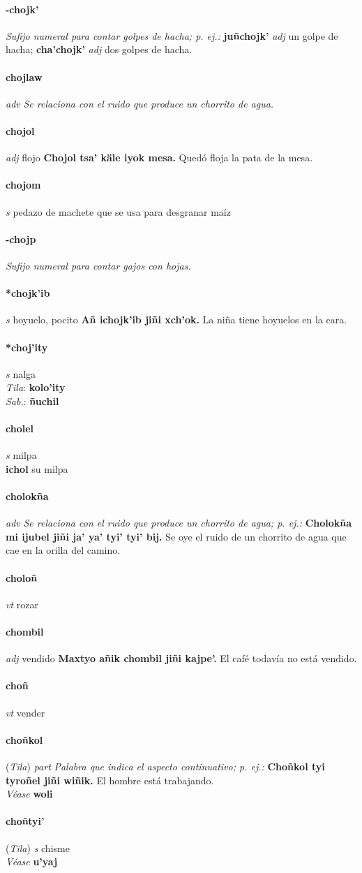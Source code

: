 \documentclass{scrbook}
\newcommand{\entry}[1]{\paragraph{#1}}
\newcommand{\nontranslationdef}[1]{\textit{#1}}
\newcommand{\partofspeech}[1]{\textit{#1}}
\newcommand{\spanishtranslation}[1]{#1}
\newcommand{\cholexample}[1]{\textbf{#1}}
\newcommand{\exampletranslation}[1]{#1}
\newcommand{\dialectvariant}[1]{\\\textit{#1}:}
\newcommand{\dialectword}[1]{\textbf{#1}}
\newcommand{\alsosee}[1]{\\\textit{Véase} \textbf{#1}}
\newcommand{\relevantdialect}[1]{(\textit{#1})}
\newcommand{\secondaryentry}[1]{\\\textbf{#1}}
\newcommand{\secondpartofspeech}[1]{\textit{#1}}
\newcommand{\secondtranslation}[1]{#1}
\begin{document}
\begin{multicols}{2}
\entry{-chojk'}
\nontranslationdef{Sufijo numeral para contar golpes de hacha; p. ej.:}
\cholexample{juñchojk'}
\secondpartofspeech{adj}
\exampletranslation{un golpe de hacha;}
\cholexample{cha'chojk'}
\secondpartofspeech{adj}
\exampletranslation{dos golpes de hacha.}

\entry{chojlaw}
\partofspeech{adv}
\nontranslationdef{Se relaciona con el ruido que produce un chorrito de agua.}

\entry{chojol}
\partofspeech{adj}
\spanishtranslation{flojo}
\cholexample{Chojol tsa' käle iyok mesa.}
\exampletranslation{Quedó floja la pata de la mesa.}

\entry{chojom}
\partofspeech{s}
\spanishtranslation{pedazo de machete que se usa para desgranar maíz}

\entry{-chojp}
\nontranslationdef{Sufijo numeral para contar gajos con hojas.}

\entry{*chojk'ib}
\partofspeech{s}
\spanishtranslation{hoyuelo, pocito}
\cholexample{Añ ichojk'ib jiñi xch'ok.}
\exampletranslation{La niña tiene hoyuelos en la cara.}

\entry{*choj'ity}
\partofspeech{s}
\spanishtranslation{nalga}
\dialectvariant{Tila}
\dialectword{kolo'ity}
\dialectvariant{Sab.}
\dialectword{ñuchil}

\entry{cholel}
\partofspeech{s}
\spanishtranslation{milpa}
\secondaryentry{ichol}
\secondtranslation{su milpa}

\entry{cholokña}
\partofspeech{adv}
\nontranslationdef{Se relaciona con el ruido que produce un chorrito de agua; p. ej.:}
\cholexample{Cholokña mi ijubel jiñi ja' ya' tyi' tyi' bij.}
\exampletranslation{Se oye el ruido de un chorrito de agua que cae en la orilla del camino.}

\entry{choloñ}
\partofspeech{vt}
\spanishtranslation{rozar}

\entry{chombil}
\partofspeech{adj}
\spanishtranslation{vendido}
\cholexample{Maxtyo añik chombil jiñi kajpe'.}
\exampletranslation{El café todavía no está vendido.}

\entry{choñ}
\partofspeech{vt}
\spanishtranslation{vender}

\entry{choñkol}
\relevantdialect{Tila}
\partofspeech{part}
\nontranslationdef{Palabra que indica el aspecto continuativo; p. ej.:}
\cholexample{Choñkol tyi tyroñel jiñi wiñik.}
\exampletranslation{El hombre está trabajando.}
\alsosee{woli}

\entry{choñtyi'}
\relevantdialect{Tila}
\partofspeech{s}
\spanishtranslation{chisme}
\alsosee{u'yaj}


\end{multicols}
\end{document}
